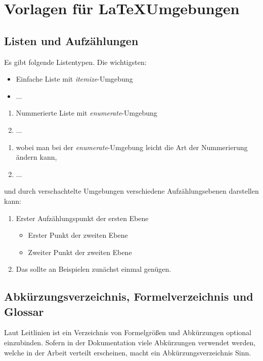 \section{Vorlagen für \LaTeX Umgebungen}

\subsection{Listen und Aufzählungen}

Es gibt folgende Listentypen. Die wichtigsten:

\begin{itemize}
	\item Einfache Liste mit \textit{itemize}-Umgebung
	\item ...
\end{itemize}

\begin{enumerate}
	\item Nummerierte Liste mit \textit{enumerate}-Umgebung
	\item ...
\end{enumerate}

\begin{enumerate}[label=\alph*.]
	\item wobei man bei der \textit{enumerate}-Umgebung leicht die Art der Nummerierung ändern kann,
	\item ...
\end{enumerate}

und durch verschachtelte Umgebungen verschiedene Aufzählungsebenen darstellen kann:

\begin{enumerate}[label=\alph*)]
	\item Erster Aufzählungspunkt der ersten Ebene
		\begin{itemize}
		\item Erster Punkt der zweiten Ebene
		\item Zweiter Punkt der zweiten Ebene
	\end{itemize}
	\item Das sollte an Beispielen zunächst einmal genügen.
\end{enumerate}

\subsection{Abkürzungsverzeichnis, Formelverzeichnis und Glossar}

Laut Leitlinien ist ein Verzeichnis von Formelgrößen und Abkürzungen optional einzubinden. Sofern in der Dokumentation viele Abkürzungen verwendet werden, welche in der Arbeit verteilt erscheinen, macht ein Abkürzungsverzeichnis Sinn.

